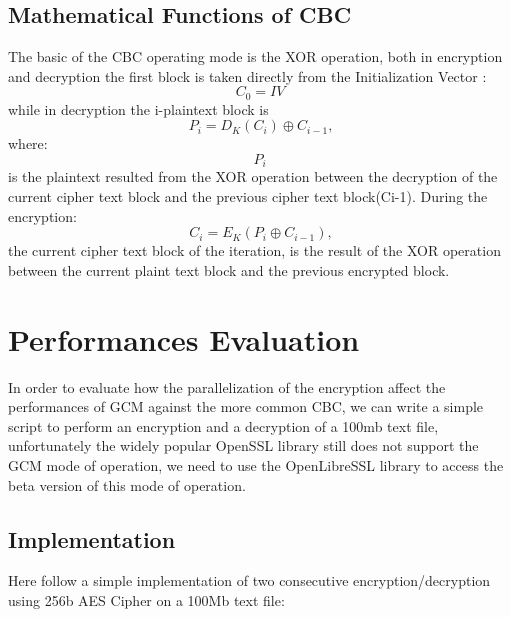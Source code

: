 \documentclass{article}
\begin{document}
\clearpage

\subsection{Mathematical Functions of CBC}

The basic of the CBC operating mode is the XOR operation, both in encryption and decryption the first block is taken directly from the Initialization Vector : \[C_{0} = IV\]  while in decryption the i-plaintext block is
\[{\ P_{i}=D_{K}(C_{i})\oplus C_{i-1},}\] where: \[P_{i}\] is the plaintext resulted from the XOR operation between the decryption of the current cipher text block and the previous cipher text block(Ci-1). 
During the encryption: \[{\ C_{i}=E_{K}(P_{i}\oplus C_{i-1}),}\] the current cipher text block of the iteration, is the result of the XOR operation between the current plaint text block and the previous encrypted block.

\section{Performances Evaluation}

In order to evaluate how the parallelization of the encryption affect the performances of GCM against the more common CBC, we can write a simple script to perform an encryption and a decryption of a 100mb  text file, unfortunately the widely popular OpenSSL library still does not support the GCM mode of operation, we need to use the OpenLibreSSL library to access the beta version of this mode of operation.

\subsection{Implementation}
Here follow a simple implementation of two consecutive encryption/decryption using 256b AES Cipher on a 100Mb text file:
\end{document}
